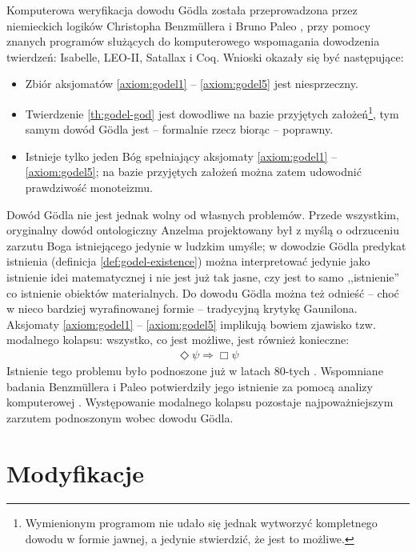 \documentclass[
	runningheads
]{llncs}
\begin{document}
Komputerowa weryfikacja dowodu G\"odla została przeprowadzona przez niemieckich logików Christopha Benzm\"ullera i Bruno Paleo \cite{benzmuller2014}, \cite{benzmuller2016} przy pomocy znanych programów służących do komputerowego wspomagania dowodzenia twierdzeń: Isabelle, LEO-II, Satallax i Coq. Wnioski okazały się być następujące:
\begin{itemize}
	\item Zbiór aksjomatów \ref{axiom:godel1} -- \ref{axiom:godel5} jest niesprzeczny. 
	\item Twierdzenie \ref{th:godel-god} jest dowodliwe na bazie przyjętych założeń\footnote{Wymienionym programom nie udało się jednak wytworzyć kompletnego dowodu w formie jawnej, a jedynie stwierdzić, że jest to możliwe.}, tym samym dowód G\"odla jest -- formalnie rzecz biorąc -- poprawny.
	\item Istnieje tylko jeden Bóg spełniający aksjomaty \ref{axiom:godel1} -- \ref{axiom:godel5}; na bazie przyjętych założeń można zatem udowodnić prawdziwość monoteizmu. 
\end{itemize}
Dowód G\"odla nie jest jednak wolny od własnych problemów. Przede wszystkim, oryginalny dowód ontologiczny Anzelma projektowany był z myślą o odrzuceniu zarzutu Boga istniejącego jedynie w ludzkim umyśle; w dowodzie G\"odla predykat istnienia (definicja \ref{def:godel-existence}) można interpretować jedynie jako istnienie idei matematycznej i nie jest już tak jasne, czy jest to samo ,,istnienie'' co istnienie obiektów materialnych. Do dowodu G\"odla można też odnieść -- choć w nieco bardziej wyrafinowanej formie -- tradycyjną krytykę Gaunilona. Aksjomaty \ref{axiom:godel1} -- \ref{axiom:godel5} implikują bowiem zjawisko tzw. modalnego kolapsu: wszystko, co jest możliwe, jest również konieczne:
\begin{align*}
\Diamond \psi \Rightarrow \Box \psi
\end{align*}
Istnienie tego problemu było podnoszone już w latach 80-tych \cite{sobel1987}. Wspomniane badania Benzm\"ullera i Paleo potwierdziły jego istnienie za pomocą analizy komputerowej \cite{benzmuller2014}. Występowanie modalnego kolapsu pozostaje najpoważniejszym zarzutem podnoszonym wobec dowodu G\"odla. 

\section{Modyfikacje} \label{sec:modyfikacje}

\setcounter{axiom-pl}{0}
\end{document}
